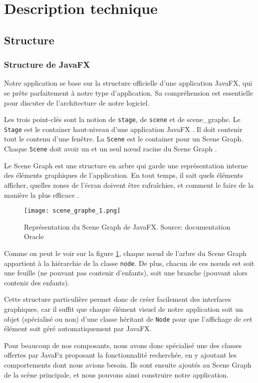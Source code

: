 \section{Description technique}

\subsection{Structure}
\subsubsection{Structure de JavaFX}
Notre application se base sur la structure officielle d'une application JavaFX, qui se prête parfaitement à notre type d'application. Sa compréhension est essentielle pour discuter de l'architecture de notre logiciel.
\par
Les trois point-clés sont la notion de \texttt{\gls{stage}}, de \texttt{\gls{scene}} et de \gls{scene_graphe}. Le \texttt{Stage} est le container haut-niveau d'une application JavaFX \cite{javadoc_stage}. Il doit contenir tout le contenu d'une fenêtre. La \texttt{Scene} est le container pour un Scene Graph. Chaque \texttt{Scene} doit avoir un et un seul n\oe ud racine du Scene Graph \cite{javadoc_scene}.
\par
Le Scene Graph est une structure en arbre qui garde une représentation interne des éléments graphiques de l'application. En tout temps, il sait quels éléments afficher, quelles zones de l'écran doivent être rafraîchies, et comment le faire de la manière la plus efficace \cite{javadoc_scene_graphe}. 	

\begin{figure}[H]
	\caption{Représentation du Scene Graph de JavaFX. Source: documentation Oracle \cite{javadoc_scene_graphe}}
	\centering
	\texttt{[image: scene\_graphe\_1.png]}
	\label{fig:scene_graphe_1}
\end{figure}
Comme on peut le voir sur la figure \ref{fig:scene_graphe_1}, chaque n\oe ud de l'arbre du Scene Graph appartient à la hiérarchie de la classe \texttt{\gls{node}}. De plus, chacun de ces n\oe uds est soit une feuille (ne pouvant pas contenir d'enfants), soit une branche (pouvant alors contenir des enfants).
\par
Cette structure particulière permet donc de créer facilement des interfaces graphiques, car il suffit que chaque élément visuel de notre application soit un objet (spécialisé ou non) d'une classe héritant de \texttt{Node} pour que l'affichage de cet élément soit géré automatiquement par JavaFX.
\par
Pour beaucoup de nos composants, nous avons donc spécialisé une des classes offertes par JavaFx proposant la fonctionnalité recherchée, en y ajoutant les comportements dont nous avions besoin. Ils sont ensuite ajoutés au Scene Graph de la scène principale, et nous pouvons ainsi construire notre application.

